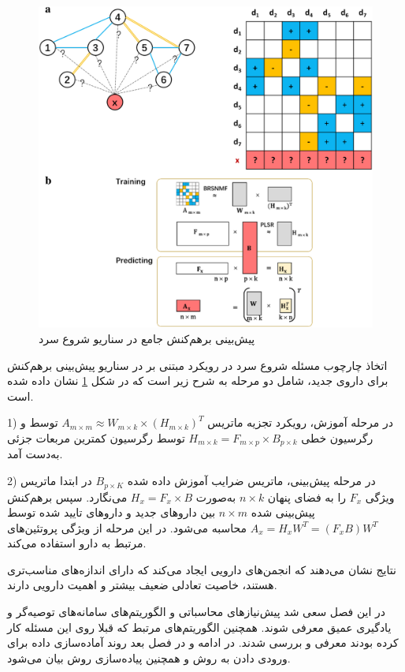 \begin{figure}[!h]
\centering
\includegraphics[scale=.3]{section2/BRSNMF.png}
	\caption{پیش‌بینی برهم‌کنش جامع در سناریو شروع سرد 
\cite{Shi J2019}}
\label{BRSNMF}
\end{figure}

اتخاذ چارچوب مسئله شروع سرد
\cite{Yu H2018}
در رویکرد مبتنی بر
در سناریو پیش‌بینی برهم‌کنش برای داروی جدید، شامل دو مرحله به شرح زیر است که در شکل
\ref{BRSNMF}
نشان داده شده است.

1) در مرحله آموزش، رویکرد تجزیه ماتریس 
$A_{m \times m} \approx W_{m \times k}\times (H_{m\times k})^T$
توسط
و رگرسیون خطی 
$H_{m\times k}=F_{m \times p}\times B_{p \times k}$
توسط رگرسیون کمترین مربعات جزئی به‌دست آمد.

2) در مرحله پیش‌بینی، ماتریس ضرایب آموزش داده شده
$B_{p \times K}$
در ابتدا ماتریس ویژگی
$F_x$ 
را به فضای پنهان
$n\times k$
به‌صورت
${H_x}={F_x\times B}$
می‌نگارد. سپس برهم‌کنش پیش‌بینی شده
$n\times m$
بین داروهای جدید و داروهای تایید شده توسط 
${A_x} = {H_xW^T} = {(F_xB)W^T}$
محاسبه می‌شود. در این مرحله از ویژگی پروتئین‌های مرتبط به دارو
استفاده می‌کند.

 نتایج نشان می‌دهند که
انجمن‌های دارویی ایجاد می‌کند که دارای اندازه‌های مناسب‌تری هستند، خاصیت تعادلی ضعیف بیشتر و اهمیت دارویی دارند. 


در این فصل سعی شد پیش‌نیازهای محاسباتی و الگوریتم‌های سامانه‌های توصیه‌گر و یادگیری عمیق معرفی شوند. همچنین الگوریتم‌های مرتبط که قبلا روی این مسئله کار کرده بودند معرفی و بررسی شدند. در ادامه و در فصل بعد روند آماده‌سازی داده برای ورودی دادن به روش و همچنین پیاده‌سازی روش بیان می‌شود.

